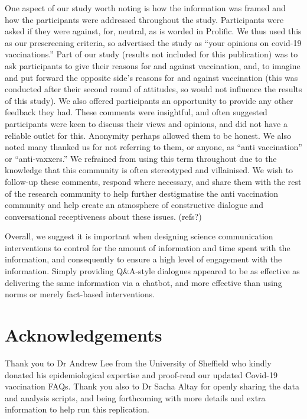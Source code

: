 \documentclass[
  english,
  ,jou,floatsintext]{apa6}
\begin{document}
One aspect of our study worth noting is how the information was framed and how the participants were addressed throughout the study. Participants were asked if they were against, for, neutral, as is worded in Prolific. We thus used this as our prescreening criteria, so advertised the study as ``your opinions on covid-19 vaccinations.'' Part of our study (results not included for this publication) was to ask participants to give their reasons for and against vaccination, and, to imagine and put forward the opposite side's reasons for and against vaccination (this was conducted after their second round of attitudes, so would not influence the results of this study). We also offered participants an opportunity to provide any other feedback they had. These comments were insightful, and often suggested participants were keen to discuss their views and opinions, and did not have a reliable outlet for this. Anonymity perhaps allowed them to be honest. We also noted many thanked us for not referring to them, or anyone, as ``anti vaccination'' or ``anti-vaxxers.'' We refrained from using this term throughout due to the knowledge that this community is often stereotyped and villainised. We wish to follow-up these comments, respond where necessary, and share them with the rest of the research community to help further destigmatise the anti vaccination community and help create an atmosphere of constructive dialogue and conversational receptiveness about these issues. (refs?)

Overall, we suggest it is important when designing science communication interventions to control for the amount of information and time spent with the information, and consequently to ensure a high level of engagement with the information. Simply providing Q\&A-style dialogues appeared to be as effective as delivering the same information via a chatbot, and more effective than using norms or merely fact-based interventions.

\hypertarget{acknowledgements}{%
\section{Acknowledgements}\label{acknowledgements}}

Thank you to Dr Andrew Lee from the University of Sheffield who kindly donated his epidemiological expertise and proof-read our updated Covid-19 vaccination FAQs.
Thank you also to Dr Sacha Altay for openly sharing the data and analysis scripts, and being forthcoming with more details and extra information to help run this replication.
\end{document}
